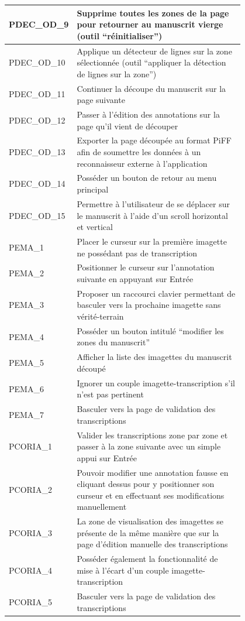 \begin{center}
\begin{tabular}{ | l | p{0.8\linewidth} | }
	\hline
	PDEC\_OD\_9 & Supprime toutes les zones de la page pour retourner au manuscrit vierge (outil “réinitialiser”) \\
	\hline
	PDEC\_OD\_10 & Applique un détecteur de lignes sur la zone sélectionnée (outil “appliquer la détection de lignes sur la zone”) \\
	\hline
	PDEC\_OD\_11 & Continuer la découpe du manuscrit sur la page suivante \\
	\hline
	PDEC\_OD\_12 & Passer à l’édition des annotations sur la page qu’il vient de découper \\
	\hline
	PDEC\_OD\_13 & Exporter la page découpée au format PiFF afin de soumettre les données à un reconnaisseur externe à l’application \\
	\hline
	PDEC\_OD\_14 & Posséder un bouton de retour au menu principal \\
	\hline
	PDEC\_OD\_15 & Permettre à l’utilisateur de se déplacer sur le manuscrit à l’aide d’un scroll horizontal et vertical \\
	\hline
	PEMA\_1 & Placer le curseur sur la première imagette ne possédant pas de transcription \\
	\hline
	PEMA\_2 & Positionner le curseur sur l’annotation suivante en appuyant sur Entrée \\
	\hline
	PEMA\_3 & Proposer un raccourci clavier permettant de basculer vers la prochaine imagette sans vérité-terrain \\
	\hline
	PEMA\_4 & Posséder un bouton intitulé “modifier les zones du manuscrit” \\
	\hline
	PEMA\_5 & Afficher la liste des imagettes du manuscrit découpé \\
	\hline
	PEMA\_6 & Ignorer un couple imagette-transcription s’il n’est pas pertinent \\
	\hline
	PEMA\_7 & Basculer vers la page de validation des transcriptions \\
	\hline
	PCORIA\_1 & Valider les transcriptions zone par zone et passer à la zone suivante avec un simple appui sur Entrée \\
	\hline
	PCORIA\_2 & Pouvoir modifier une annotation fausse en cliquant dessus pour y positionner son curseur et en effectuant ses modifications manuellement \\
	\hline
	PCORIA\_3 & La zone de visualisation des imagettes se présente de la même manière que sur la page d’édition manuelle des transcriptions \\
	\hline
	PCORIA\_4 & Posséder également la fonctionnalité de mise à l’écart d’un couple imagette-transcription \\
	\hline
	PCORIA\_5 & Basculer vers la page de validation des transcriptions \\
	\hline
\end{tabular}


\end{center}
